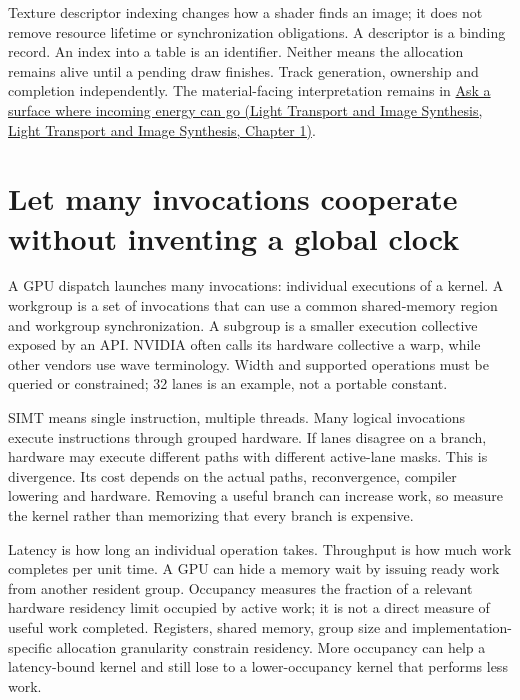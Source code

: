Texture descriptor indexing changes how a shader finds an image; it does not remove resource lifetime or synchronization obligations. A descriptor is a binding record. An index into a table is an identifier. Neither means the allocation remains alive until a pending draw finishes. Track generation, ownership and completion independently. The material-facing interpretation remains in \href{../04-Light-Transport-and-Image-Synthesis/main.pdf\#nameddest=03-visual-computing-i-ch005-ask-a-surface-where-incoming-energy-can-go}{Ask a surface where incoming energy can go (Light Transport and Image Synthesis, Light Transport and Image Synthesis, Chapter 1)}.

\section{Let many invocations cooperate without inventing a global clock}\label{01-foundations-i-ch008-let-many-invocations-cooperate-without-inventing-a-global-clock}

A GPU dispatch launches many invocations: individual executions of a kernel. A workgroup is a set of invocations that can use a common shared-memory region and workgroup synchronization. A subgroup is a smaller execution collective exposed by an API. NVIDIA often calls its hardware collective a warp, while other vendors use wave terminology. Width and supported operations must be queried or constrained; 32 lanes is an example, not a portable constant.

SIMT means single instruction, multiple threads. Many logical invocations execute instructions through grouped hardware. If lanes disagree on a branch, hardware may execute different paths with different active-lane masks. This is divergence. Its cost depends on the actual paths, reconvergence, compiler lowering and hardware. Removing a useful branch can increase work, so measure the kernel rather than memorizing that every branch is expensive.

Latency is how long an individual operation takes. Throughput is how much work completes per unit time. A GPU can hide a memory wait by issuing ready work from another resident group. Occupancy measures the fraction of a relevant hardware residency limit occupied by active work; it is not a direct measure of useful work completed. Registers, shared memory, group size and implementation-specific allocation granularity constrain residency. More occupancy can help a latency-bound kernel and still lose to a lower-occupancy kernel that performs less work.

